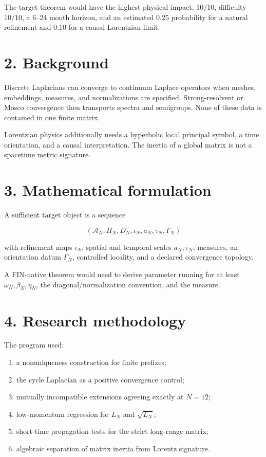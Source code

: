 \documentclass[11pt,a4paper,openany]{report}
\begin{document}
The target theorem would have the highest physical impact, \(10/10\), difficulty \(10/10\), a 6–24 month horizon, and an estimated \(0.25\) probability for a natural refinement and \(0.10\) for a causal Lorentzian limit.

\section{2. Background}

Discrete Laplacians can converge to continuum Laplace operators when meshes, embeddings, measures, and normalizations are specified. Strong-resolvent or Mosco convergence then transports spectra and semigroups. None of these data is contained in one finite matrix.

Lorentzian physics additionally needs a hyperbolic local principal symbol, a time orientation, and a causal interpretation. The inertia of a global matrix is not a spacetime metric signature.

\section{3. Mathematical formulation}

A sufficient target object is a sequence

\[
(\mathcal A_N,H_N,D_N,\iota_N,a_N,\tau_N,\Gamma_N)
\]

with refinement maps \(\iota_N\), spatial and temporal scales \(a_N,\tau_N\), measures, an orientation datum \(\Gamma_N\), controlled locality, and a declared convergence topology.

A FIN-native theorem would need to derive parameter running for at least \(\omega_N,\beta_N,\eta_N\), the diagonal/\allowbreak{}normalization convention, and the measure.

\section{4. Research methodology}

The program used:

\begin{enumerate}
\item 
a nonuniqueness construction for finite prefixes;

\item 
the cycle Laplacian as a positive convergence control;

\item 
mutually incompatible extensions agreeing exactly at \(N=12\);

\item 
low-momentum regression for \(L_N\) and \(\sqrt{L_N}\);

\item 
short-time propagation tests for the strict long-range matrix;

\item 
algebraic separation of matrix inertia from Lorentz signature.

\end{enumerate}
\end{document}
